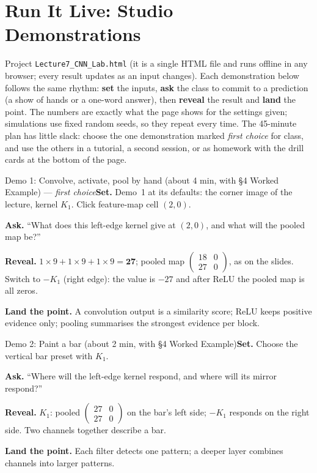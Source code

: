 \documentclass[11pt]{article}
\begin{document}
\section{Run It Live: Studio Demonstrations}\label{sec:live}

Project \texttt{Lecture7\_CNN\_Lab.html} (it is a single HTML file and runs offline in any browser; every result updates as an input changes). Each demonstration below follows the same rhythm: \textbf{set} the inputs, \textbf{ask} the class to commit to a prediction (a show of hands or a one-word answer), then \textbf{reveal} the result and \textbf{land} the point. The numbers are exactly what the page shows for the settings given; simulations use fixed random seeds, so they repeat every time. The 45-minute plan has little slack: choose the one demonstration marked \emph{first choice} for class, and use the others in a tutorial, a second session, or as homework with the drill cards at the bottom of the page.

\begin{live}{Demo 1: Convolve, activate, pool by hand (about 4 min, with \S4 Worked Example) --- \emph{first choice}}\textbf{Set.} Demo~1 at its defaults: the corner image of the lecture, kernel $K_1$. Click feature-map cell $(2,0)$.\par\smallskip\textbf{Ask.} ``What does this left-edge kernel give at $(2,0)$, and what will the pooled map be?''\par\smallskip\textbf{Reveal.} $1\times9+1\times9+1\times9=\textbf{27}$; pooled map $\begin{pmatrix}18&0\\27&0\end{pmatrix}$, as on the slides. Switch to $-K_1$ (right edge): the value is $-27$ and after ReLU the pooled map is all zeros.\par\smallskip\textbf{Land the point.} A convolution output is a similarity score; ReLU keeps positive evidence only; pooling summarises the strongest evidence per block.\end{live}

\begin{live}{Demo 2: Paint a bar (about 2 min, with \S4 Worked Example)}\textbf{Set.} Choose the \textsf{vertical bar} preset with $K_1$.\par\smallskip\textbf{Ask.} ``Where will the left-edge kernel respond, and where will its mirror respond?''\par\smallskip\textbf{Reveal.} $K_1$: pooled $\begin{pmatrix}27&0\\27&0\end{pmatrix}$ on the bar's left side; $-K_1$ responds on the right side. Two channels together describe a bar.\par\smallskip\textbf{Land the point.} Each filter detects one pattern; a deeper layer combines channels into larger patterns.\end{live}
\end{document}
